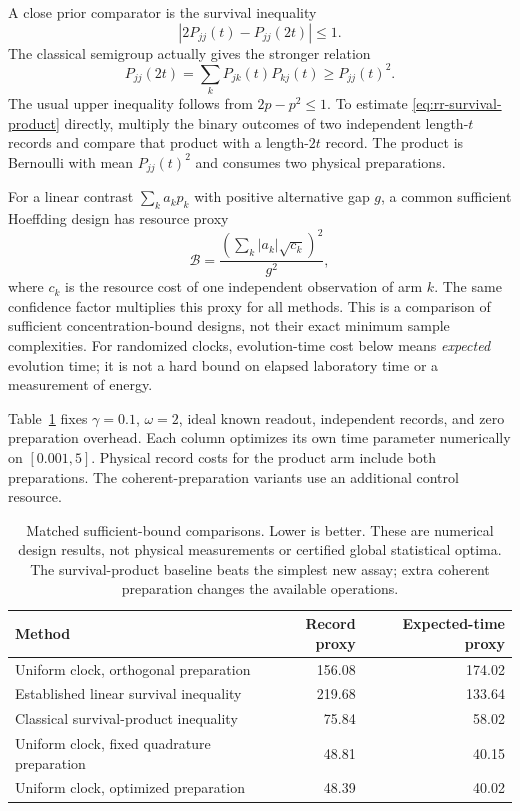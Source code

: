 A close prior comparator is the survival inequality
\cite{rrLambert2010}
\[
 |2P_{jj}(t)-P_{jj}(2t)|\le1.
\]
The classical semigroup actually gives the stronger relation
\begin{equation}
 P_{jj}(2t)=\sum_kP_{jk}(t)P_{kj}(t)\ge P_{jj}(t)^2.
 \label{eq:rr-survival-product}
\end{equation}
The usual upper inequality follows from $2p-p^2\le1$.  To estimate
\eqref{eq:rr-survival-product} directly, multiply the binary outcomes of two
independent length-$t$ records and compare that product with a length-$2t$
record.  The product is Bernoulli with mean $P_{jj}(t)^2$ and consumes two
physical preparations.

For a linear contrast $\sum_k a_k p_k$ with positive alternative gap $g$, a
common sufficient Hoeffding design has resource proxy
\begin{equation}
 \mathcal B=\frac{\left(\sum_k |a_k|\sqrt{c_k}\right)^2}{g^2},
 \label{eq:rr-hoeffding-proxy}
\end{equation}
where $c_k$ is the resource cost of one independent observation of arm $k$.
The same confidence factor multiplies this proxy for all methods.  This is a
comparison of sufficient concentration-bound designs, not their exact minimum
sample complexities.  For randomized clocks, evolution-time cost below means
\emph{expected} evolution time; it is not a hard bound on elapsed laboratory
time or a measurement of energy.

Table~\ref{tab:rr-baselines} fixes $\gamma=0.1$, $\omega=2$, ideal known readout,
independent records, and zero preparation overhead.  Each column optimizes its
own time parameter numerically on $[0.001,5]$.  Physical record costs for the
product arm include both preparations.  The coherent-preparation variants use
an additional control resource.

\begin{table}[htbp]
\centering
\begin{tabular}{lrr}
\hline
Method & Record proxy & Expected-time proxy\\
\hline
Uniform clock, orthogonal preparation &156.08&174.02\\
Established linear survival inequality &219.68&133.64\\
Classical survival-product inequality &75.84&58.02\\
Uniform clock, fixed quadrature preparation &48.81&40.15\\
Uniform clock, optimized preparation &48.39&40.02\\
\hline
\end{tabular}
\caption{Matched sufficient-bound comparisons.  Lower is better.  These are
numerical design results, not physical measurements or certified global
statistical optima.  The survival-product baseline beats the simplest new
assay; extra coherent preparation changes the available operations.}
\label{tab:rr-baselines}
\end{table}

